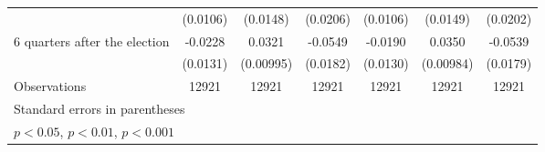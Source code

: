 \begin{table}[!ht]
\begin{tabular}{l*{6}{c}}
                    &    (0.0106)         &    (0.0148)         &    (0.0206)         &    (0.0106)         &    (0.0149)         &    (0.0202)         \\
[1em]
 6 quarters after the election&     -0.0228         &      0.0321\sym{**} &     -0.0549\sym{**} &     -0.0190         &      0.0350\sym{***}&     -0.0539\sym{**} \\
                    &    (0.0131)         &   (0.00995)         &    (0.0182)         &    (0.0130)         &   (0.00984)         &    (0.0179)         \\
\hline
Observations        &       12921         &       12921         &       12921         &       12921         &       12921         &       12921         \\
\hline\hline
\multicolumn{7}{l}{\footnotesize Standard errors in parentheses}\\
\multicolumn{7}{l}{\footnotesize \sym{*} \(p<0.05\), \sym{**} \(p<0.01\), \sym{***} \(p<0.001\)}\\
\end{tabular}
\end{table}
